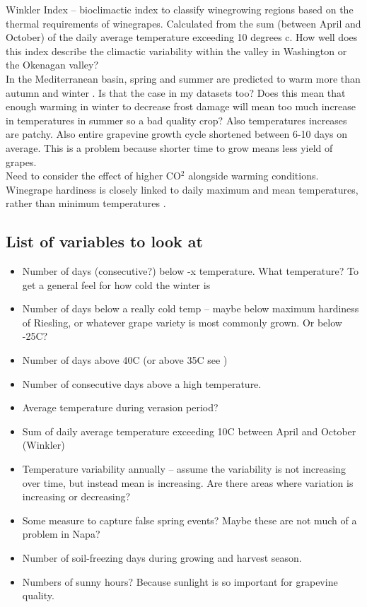 \documentclass[11pt,letter]{article}
\begin{document}
Winkler Index – bioclimactic index to classify winegrowing regions based on the thermal requirements of winegrapes. Calculated from the sum (between April and October) of the daily average temperature  exceeding 10 degrees c. How well does this index describe the climactic variability within the valley in Washington or the Okenagan valley? \\

In the Mediterranean basin, spring and summer are predicted to warm more than autumn and winter \citep{Ferrise2016}. Is that the case in my datasets too? Does this mean that enough warming in winter to decrease frost damage will mean too much increase in temperatures in summer so a bad quality crop? Also temperatures increases are patchy. Also entire grapevine growth cycle shortened between 6-10 days on average. This is a problem because shorter time to grow means less yield of grapes. \\

Need to consider the effect of higher CO$^2$ alongside warming conditions. \\

Winegrape hardiness is closely linked to daily maximum and mean temperatures, rather than minimum temperatures \citep{Hubackova1996}. 

\subsection{List of variables to look at}

\begin{itemize} 
\item Number of days (consecutive?) below -x temperature. What temperature? To get a general feel for how cold the winter is
\item Number of days below a really cold temp – maybe below maximum hardiness of Riesling, or whatever grape variety is most commonly grown. Or below -25\textdegree C?
\item Number of days above 40\textdegree C (or above 35\textdegree C see \cite{Blanco-Ward2017})
\item Number of consecutive days above a high temperature.
\item Average temperature during verasion period? 
\item Sum of daily average temperature  exceeding 10\textdegree C between April and October (Winkler)
\item Temperature variability annually – assume the variability is not increasing over time, but instead mean is increasing. Are there areas where variation is increasing or decreasing?
\item Some measure to capture false spring events? Maybe these are not much of a problem in Napa? 
\item Number of soil-freezing days during growing and harvest season.
\item Numbers of sunny hours? Because sunlight is so important for grapevine quality. 
\end{itemize}
\end{document}
